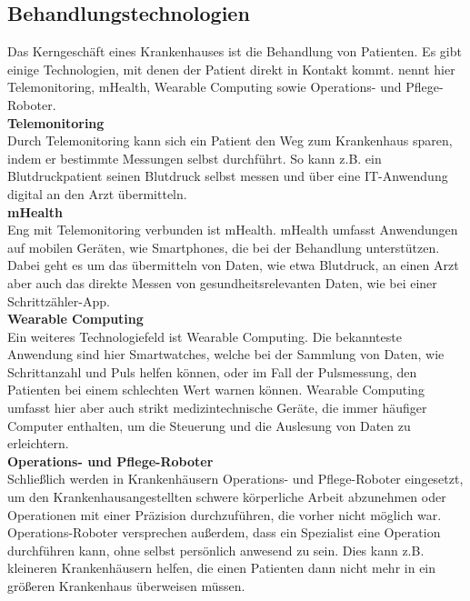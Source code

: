 \subsection{Behandlungstechnologien}
	Das Kerngeschäft eines Krankenhauses ist die Behandlung von Patienten. Es gibt einige Technologien, mit denen der Patient direkt in Kontakt kommt.
	\cite{braeutigam2017} nennt hier Telemonitoring, mHealth, Wearable Computing sowie Operations- und Pflege-Roboter.
	\vspace{\parheadvspace}\\
	\textbf{Telemonitoring}\\
	Durch Telemonitoring kann sich ein Patient den Weg zum Krankenhaus sparen, indem er bestimmte Messungen selbst durchführt. So kann z.B. ein Blutdruckpatient seinen Blutdruck selbst messen und über eine IT-Anwendung digital an den Arzt übermitteln. 
	\vspace{\parheadvspace}\\
	\textbf{mHealth}\\
	Eng mit Telemonitoring verbunden ist mHealth. mHealth umfasst Anwendungen auf mobilen Geräten, wie Smartphones, die bei der Behandlung unterstützen. Dabei geht es um das übermitteln von Daten, wie etwa Blutdruck, an einen Arzt aber auch das direkte Messen von gesundheitsrelevanten Daten, wie bei einer Schrittzähler-App. \parencite{Matusiewicz2017}
	\vspace{\parheadvspace}\\
	\textbf{Wearable Computing}\\
	Ein weiteres Technologiefeld ist Wearable Computing. Die bekannteste Anwendung sind hier Smartwatches, welche bei der Sammlung von Daten, wie Schrittanzahl und Puls helfen können, oder im Fall der Pulsmessung, den Patienten bei einem schlechten Wert warnen können. Wearable Computing umfasst hier aber auch strikt medizintechnische Geräte, die immer häufiger Computer enthalten, um die Steuerung und die Auslesung von Daten zu erleichtern. \parencite{Gerke2017}
	\vspace{\parheadvspace}\\
	\textbf{Operations- und Pflege-Roboter}\\
	Schließlich werden in Krankenhäusern Operations- und Pflege-Roboter eingesetzt, um den Krankenhausangestellten schwere körperliche Arbeit abzunehmen oder Operationen mit einer Präzision durchzuführen, die vorher nicht möglich war. Operations-Roboter versprechen außerdem, dass ein Spezialist eine Operation durchführen kann, ohne selbst persönlich anwesend zu sein. Dies kann z.B. kleineren Krankenhäusern helfen, die einen Patienten dann nicht mehr in ein größeren Krankenhaus überweisen müssen. \parencite{Bardash2010}
